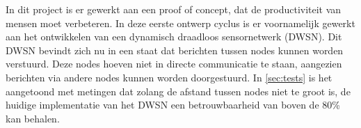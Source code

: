 




In dit project is er gewerkt aan een proof of concept, dat de productiviteit van mensen moet verbeteren. In deze eerste ontwerp cyclus is er voornamelijk gewerkt aan het ontwikkelen van een dynamisch draadloos sensornetwerk (DWSN). Dit DWSN bevindt zich nu in een staat dat berichten tussen nodes kunnen worden verstuurd. Deze nodes hoeven niet in directe communicatie te staan, aangezien berichten via andere nodes kunnen worden doorgestuurd. In \autoref{sec:tests} is het aangetoond met metingen dat zolang de afstand tussen nodes niet te groot is, de huidige implementatie van het DWSN een betrouwbaarheid van boven de 80\% kan behalen. 